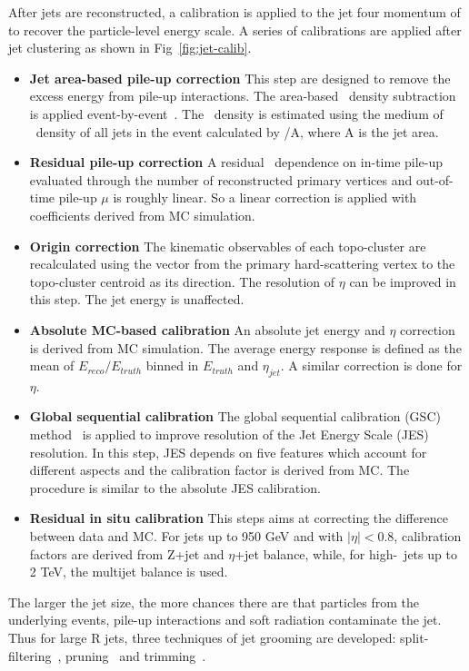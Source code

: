 \par After jets are reconstructed, a calibration is applied to the jet four momentum of to recover the particle-level energy scale.
A series of calibrations are applied after jet clustering as shown in Fig~\ref{fig:jet-calib}.

\begin{itemize}
    \item \textbf{Jet area-based pile-up correction} This step are designed to remove the excess energy from pile-up interactions. The area-based \pt~density subtraction is applied event-by-event~\cite{Cacciari:2007fd}. The \pt~density is estimated using the medium of \pt~density of all jets in the event calculated by \pt/A, where A is the jet area.
    \item \textbf{Residual pile-up correction} A residual \pt~dependence on in-time pile-up evaluated through the number of reconstructed primary vertices and out-of-time pile-up $\mu$ is roughly linear. So a linear correction is applied with coefficients derived from MC simulation. 
    \item \textbf{Origin correction} The kinematic observables of each topo-cluster are recalculated using the vector from the primary hard-scattering vertex to the topo-cluster centroid as its direction. The resolution of $\eta$ can be improved in this step. The jet energy is unaffected.
    \item \textbf{Absolute MC-based calibration} An absolute jet energy and $\eta$ correction is derived from MC simulation. The average energy response is defined as the mean of $E_{reco}/E_{truth}$ binned in $E_{truth}$ and $\eta_{jet}$. A similar correction is done for $\eta$.
    \item \textbf{Global sequential calibration} The global sequential calibration (GSC) method~\cite{Aad:2011he} is applied to improve resolution of the Jet Energy Scale (JES) resolution. In this step, JES depends on five features which account for different aspects and the calibration factor is derived from MC. The procedure is similar to the absolute JES calibration.
    \item \textbf{Residual in situ calibration} This steps aims at correcting the difference between data and MC. For jets up to 950 GeV and with $|\eta| < 0.8$, calibration factors are derived from Z+jet and $\eta$+jet balance, while, for high-\pt~jets up to 2 TeV, the multijet balance is used.
\end{itemize}

\par The larger the jet size, the more chances there are that particles from the underlying events, pile-up interactions and soft radiation contaminate the jet. Thus for large R jets, three techniques of jet grooming are developed:
split-filtering~\cite{Butterworth:2008iy}, pruning~\cite{Ellis:2009me} and trimming~\cite{Krohn:2009th}. 

